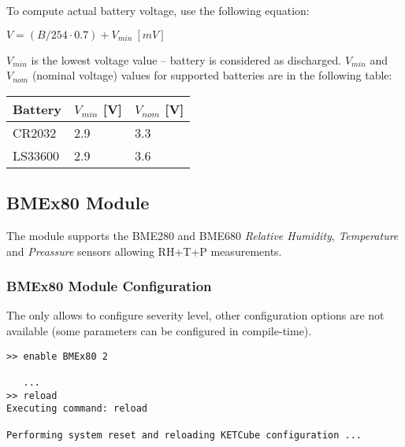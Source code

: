   To compute actual battery voltage, use the following equation:
  
  $V = (B/254 \cdot 0.7) + V_{min} ~[mV]$
  
  $V_{min}$ is the lowest voltage value -- battery is considered as discharged. $V_{min}$ and $V_{nom}$ (nominal voltage) values for supported batteries are in the following table:
  
  \begin{table*}[!ht]
    \begin{tabular}{| p{3.5cm} | p{2cm} | p{2cm} |}
        \hline
        \rowcolor{SeaGreen3!30!} {\bf Battery} & $V_{min}$ [V] & $V_{nom}$ [V] \\
        \hline
        \hline
        CR2032 & 2.9 & 3.3 \\
        \hline
        LS33600 & 2.9 & 3.6 \\
        \hline
    \end{tabular}
    \label{tab:spec:AMR}
   \end{table*}
  

\clearpage
\subsection{BMEx80 Module}

The  module supports the BME280 and BME680 {\it Relative Humidity}, {\it Temperature} and {\it Preassure} sensors  allowing RH+T+P measurements.
  
\subsubsection{BMEx80 Module Configuration}
  
The  only allows to configure severity level, other configuration options are not available (some parameters can be configured in compile-time).
  
\begin{docCodeExample}
\begin{verbatim}
>> enable BMEx80 2

   ...
>> reload
Executing command: reload

Performing system reset and reloading KETCube configuration ...  
\end{verbatim}
\end{docCodeExample}
  
